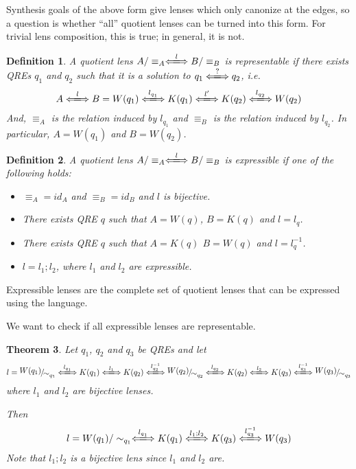 \documentclass[a4paper,11pt] {article}
\theoremstyle{plain}
\newtheorem{theorem}{Theorem}[section]
\newtheorem{definition}[theorem]{Definition}
\newcommand{\lensbetween}[1]{\xLongleftrightarrow{#1}}
\newcommand{\niceFrac}[2]{%
    \raise.5ex\hbox{$#1$}%
    \kern-.1em/\kern-.15em%
    \lower.25ex\hbox{$#2$}}
\begin{document}
Synthesis goals of the above form give lenses which only canonize at
the edges, so a question is whether ``all'' quotient lenses can be
turned into this form.
For trivial lens composition, this is true;
in general, it is not.

\begin{definition}
  A quotient lens
  $A/\equiv_A \lensbetween{l} B/\equiv_B$
  is representable if there exists QREs $q_1$ and $q_2$ such that
  it is a solution to $q_1 \lensbetween{?} q_2$, i.e.
  \begin{align*}
    A \lensbetween{l} B =
    W(q_1) \lensbetween{l_{q_1}} K(q_1)
    \lensbetween{l'}
    K(q_2) \lensbetween{l_{q_2}} W(q_2)
  \end{align*}
  And, $\equiv_A$ is the relation induced by $l_{q_1}$ and $\equiv_B$
  is the relation induced by $l_{q_2}$.
  In particular, $A = W(q_1)$ and $B = W(q_2)$.
\end{definition}

\begin{definition}
  A quotient lens
  $A/\equiv_A \lensbetween{l} B/\equiv_B$
  is expressible if one of the following holds:
  \begin{itemize}
  \item $\equiv_A = id_A$ and $\equiv_B = id_B$ 
    and $l$ is bijective.
  \item There exists QRE $q$ such that $A = W(q)$,
    $B = K(q)$ and $l = l_q$.
  \item There exists QRE $q$ such that $A = K(q)$
    $B = W(q)$ and $l = l_q^{-1}$.    
  \item $l = l_1 ; l_2$, where $l_1$ and $l_2$ are expressible.
  \end{itemize}
\end{definition}
Expressible lenses are the complete set of quotient lenses that can
be expressed using the language.

We want to check if all expressible lenses are representable.

\begin{theorem}
  \label{thm:composition}
  Let $q_1$, $q_2$ and $q_3$ be QREs and let
  \begin{align*}
    l = \niceFrac{W(q_1)}{\sim_{q_1}} \lensbetween{l_{q_1}} K(q_1)
    \lensbetween{l_1} K(q_2) \lensbetween{l_{q_2}^{-1}} \niceFrac{W(q_2)}{\sim_{q_2}}
    \lensbetween{l_{q_2}} K(q_2) \lensbetween{l_2} K(q_3)
    \lensbetween{l_{q_3}^{-1}} \niceFrac{W(q_3)}{\sim_{q_3}}
  \end{align*}
  where $l_1$ and $l_2$ are bijective lenses.

  Then
  \begin{align*}
    l = 
    W(q_1)/\sim_{q_1} \lensbetween{l_{q_1}} K(q_1)
    \lensbetween{l_1; l_2} K(q_3) \lensbetween{l_{q_3}^{-1}} W(q_3)
  \end{align*}
  Note that $l_1; l_2$ is a bijective lens since $l_1$ and $l_2$ are.
\end{theorem}
\end{document}
